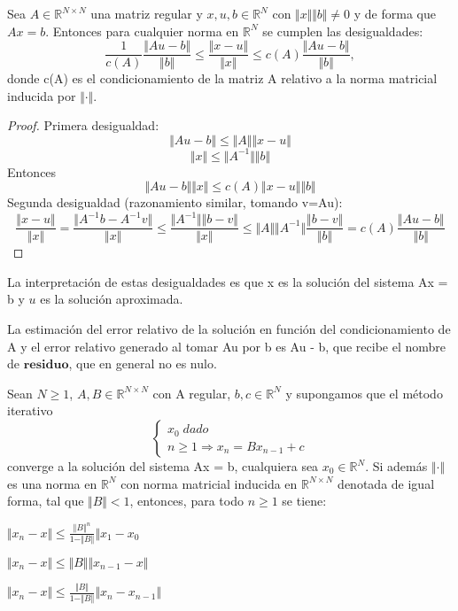 \begin{nprop}
Sea $A \in \mathbb{R}^{N \times N}$ una matriz regular y $x, u, b \in \mathbb{R}^N$ con $\Vert x \Vert \Vert b \Vert \neq 0$ y de forma que $Ax = b$. Entonces para cualquier norma en $\mathbb{R}^N$ se cumplen las desigualdades:
\[
\frac{1}{c(A)} \frac{\Vert Au-b \Vert } {\Vert b \Vert }
\leq
\frac{\Vert x-u \Vert }{\Vert x \Vert }
\leq
c(A) \frac{\Vert Au-b \Vert } {\Vert b \Vert },
\]
donde c(A) es el condicionamiento de la matriz A relativo a la norma matricial inducida por $\Vert \cdot \Vert$.
\end{nprop}
	\begin{proof}
	Primera desigualdad:
	\[ \Vert Au - b \Vert \leq \Vert A \Vert \Vert x-u \Vert \]
	\[ \Vert x \Vert \leq \Vert A^{-1} \Vert \Vert b \Vert \]
	Entonces
	\[ \Vert Au-b \Vert \Vert x \Vert \leq c(A) \Vert x-u \Vert \Vert b \Vert \]
	Segunda desigualdad (razonamiento similar, tomando v=Au):
	\[
	\frac{\Vert x-u \Vert }{\Vert x \Vert } = \frac{\Vert A^{-1}b-A^{-1}v \Vert }{\Vert x \Vert }
	\leq
	\frac{\Vert A^{-1} \Vert \Vert b-v \Vert }{\Vert x \Vert }
	\leq
	\Vert A \Vert \Vert A^{-1} \Vert \frac{\Vert b-v \Vert }{\Vert b \Vert }
	=
	c(A) \frac{\Vert Au-b \Vert }{\Vert b \Vert }
	\]
	\end{proof}

La interpretación de estas desigualdades es que x es la solución del sistema Ax = b y $u$ es la solución aproximada.

La estimación del error relativo de la solución en función del condicionamiento de A y el error relativo generado al tomar Au por b es Au - b, que recibe el nombre de $\textbf{residuo}$, que en general no es nulo.

\begin{nprop}
Sean $N \geq 1$, $A, B \in \mathbb{R}^{N \times N}$ con A regular, $b,c \in \mathbb{R}^N$ y supongamos que el método iterativo
\[ \left\{ \begin{array}{l}
x_0 \; dado \\
n \geq 1 \Rightarrow x_n = Bx_{n-1} + c
\end{array}
\right. \]
converge a la solución del sistema Ax = b, cualquiera sea $x_0 \in \mathbb{R}^N$. Si además $\Vert \cdot \Vert$ es una norma en $\mathbb{R}^N$ con norma matricial inducida en $\mathbb{R}^{N \times N}$ denotada de igual forma, tal que $\Vert B \Vert < 1$, entonces, para todo $n \geq 1$ se tiene:
	\begin{nlist}
	\item $\Vert x_n - x \Vert \leq \frac{\Vert B \Vert ^n}{1 - \Vert B \Vert} \Vert x_1 - x_0$
	\item $\Vert x_n - x \Vert \leq \Vert B \Vert \Vert x_{n-1} - x \Vert$
	\item $\Vert x_n - x \Vert \leq \frac{\Vert B \Vert}{1 - \Vert B \Vert} \Vert x_n - x_{n-1} \Vert$
	\end{nlist}
\end{nprop}


